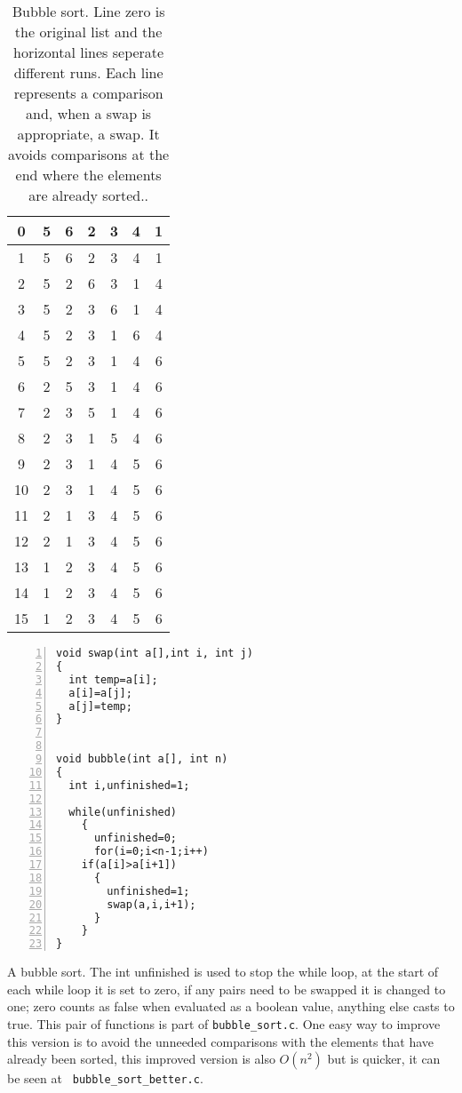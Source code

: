 \documentclass[11pt,a4paper]{scrartcl}
\begin{document}
\begin{table}
\begin{tabular}{c|cccccc}
0&5&6&2&3&4&1\\
\hline
1&5&6&2&3&4&1\\
2&5&2&6&3&1&4\\
3&5&2&3&6&1&4\\
4&5&2&3&1&6&4\\
5&5&2&3&1&4&6\\
\hline
6&2&5&3&1&4&6\\
7&2&3&5&1&4&6\\
8&2&3&1&5&4&6\\
9&2&3&1&4&5&6\\
\hline
10&2&3&1&4&5&6\\
11&2&1&3&4&5&6\\
12&2&1&3&4&5&6\\
\hline
13&1&2&3&4&5&6\\
14&1&2&3&4&5&6\\
\hline
15&1&2&3&4&5&6\\
\end{tabular}
\caption{Bubble sort. Line zero is the original list and the
  horizontal lines seperate different runs. Each line represents a
  comparison and, when a swap is appropriate, a swap. It avoids
  comparisons at the end where the elements are already
  sorted.. \label{table_bubble}}
\end{table}

\begin{table}
\begin{lstlisting}[numbers=left]
void swap(int a[],int i, int j)
{
  int temp=a[i];
  a[i]=a[j];
  a[j]=temp;
}


void bubble(int a[], int n)
{
  int i,unfinished=1;
  
  while(unfinished)
    {
      unfinished=0;
      for(i=0;i<n-1;i++)
	if(a[i]>a[i+1])
	  {
	    unfinished=1;
	    swap(a,i,i+1);	    
	  }
    }
}
\end{lstlisting}
\caption{A bubble sort. The int unfinished is used to stop the while
  loop, at the start of each while loop it is set to zero, if any
  pairs need to be swapped it is changed to one; zero counts as false
  when evaluated as a boolean value, anything else casts to true. This
  pair of functions is part of {\tt bubble\_sort.c}. One easy way to
  improve this version is to avoid the unneeded comparisons with the
  elements that have already been sorted, this improved version is
  also $O(n^2)$ but is quicker, it can be seen at {\tt
    bubble\_sort\_better.c}. \label{c_bubble}}
\end{table}
\end{document}
